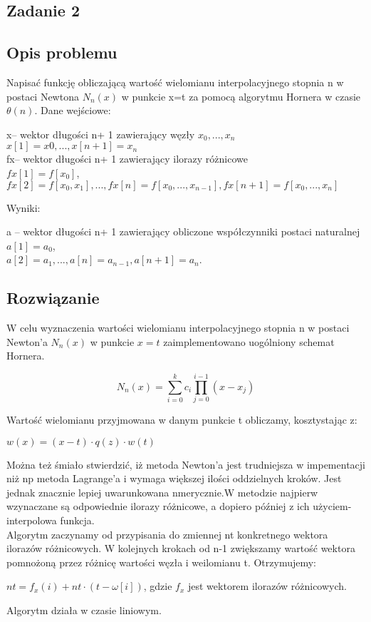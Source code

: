 \documentclass[11pt]{article}
\begin{document}
\begin{flushleft}
\section{Zadanie 2}
\subsection{Opis problemu}
Napisać funkcję obliczającą wartość wielomianu interpolacyjnego stopnia n w postaci Newtona $N_n(x)$ w punkcie x=t za pomocą algorytmu Hornera w czasie $\theta(n)$. Dane wejściowe:\\
\begin{center}
x– wektor długości n+ 1 zawierający węzły $x_0, ...,x_n$\\$x[1]=x0,...,x[n+1]=x_n$\\
fx– wektor długości n+ 1 zawierający ilorazy  różnicowe \\$fx[1]=f[x_0]$,\\
$fx[2]=f[x_0, x_1],...,fx[n]=f[x_0, . . . , x_{n−1}],fx[n+1]=f[x_0, . . . , x_n]$
\end{center}
\begin{flushleft}
Wyniki:
\begin{center}
a – wektor długości n+ 1 zawierający obliczone współczynniki postaci naturalnej\\
$a[1]=a_0$,\\
$a[2]=a_1,...,a[n]
=a_{n−1},a[n+1]=a_n$.\\
\end{center}
\end{flushleft}
\subsection{Rozwiązanie}
W celu wyznaczenia wartości wielomianu interpolacyjnego stopnia n w postaci Newton'a $N_n(x)$ w punkcie $x=t$ zaimplementowano uogólniony schemat Hornera.\\
\begin{center}
$$N_n(x)=\sum^k_{i=0}c_i\prod^{i-1}_{j=0}(x-x_j)$$
\end{center}
Wartość wielomianu przyjmowana w danym punkcie t obliczamy, kosztystając z:\\
\begin{center}$w(x)=(x-t)\cdot q(z)\cdot w(t)$\end{center}
Można też śmiało stwierdzić, iż metoda Newton'a jest trudniejsza w impementacji niż np metoda Lagrange'a i wymaga większej ilości oddzielnych kroków. Jest jednak znacznie lepiej uwarunkowana nmerycznie.W metodzie najpierw wzynaczane są odpowiednie ilorazy różnicowe, a dopiero później z ich użyciem- interpolowa funkcja.\\
Algorytm zaczynamy od przypisania do zmiennej nt konkretnego wektora ilorazów różnicowych. W kolejnych krokach od n-1 zwiększamy wartość wektora pomnożoną przez różnicę wartości węzła i weilomianu t. Otrzymujemy:\\
\begin{center}
$nt=f_x(i)+nt\cdot (t-\omega[i])$, gdzie $f_x$ jest wektorem ilorazów różnicowych.\\
\end{center}
Algorytm działa w czasie liniowym.
\newpage

\end{flushleft}
\end{document}
